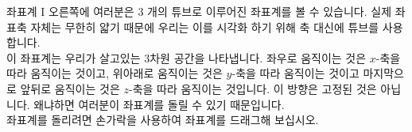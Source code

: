 \begin{surferPage}{좌표계 I}
오른쪽에 여러분은 $3$ 개의 튜브로 이루어진 좌표계를 볼 수 있습니다. 실제 좌표축 자체는 무한히 얇기 때문에 우리는 이를  시각화 하기 위해 축 대신에 튜브를 사용합니다.\\
이 좌표계는 우리가 살고있는 3차원 공간을 나타냅니다. 좌우로 움직이는 것은 $x$-축을 따라 움직이는 것이고, 위아래로 움직이는 것은 $y$-축을 따라 움직이는 것이고 마지막으로 앞뒤로 움직이는 것은 $z$-축을 따라 움직이는 것입니다. 이 방향은 고정된 것은 아닙니다. 왜냐하면 여러분이 좌표계를 돌릴 수 있기 때문입니다.\\
\vspace{0.3cm}
좌표계를 돌리려면 손가락을 사용하여 좌표계를 드래그해 보십시오.
\end{surferPage}
